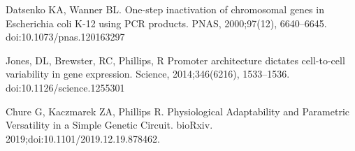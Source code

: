 \documentclass[10pt,letterpaper]{article}
\begin{document}
\begin{thebibliography}{10}
	Datsenko KA, Wanner BL.
	\newblock One-step inactivation of chromosomal genes
	in Escherichia coli K-12 using PCR products.
	\newblock PNAS, 2000;97(12), 6640–6645.
	\newblock doi:{10.1073/pnas.120163297}

	Jones, DL, Brewster, RC, Phillips, R
	\newblock Promoter architecture dictates cell-to-cell variability in gene expression.
	\newblock Science, 2014;346(6216), 1533--1536.
	\newblock doi:{10.1126/science.1255301}

	Chure G, Kaczmarek ZA, Phillips R.
	\newblock Physiological Adaptability and Parametric Versatility in a Simple
	Genetic Circuit.
	\newblock bioRxiv. 2019;doi:{10.1101/2019.12.19.878462}.

\end{thebibliography}
\end{document}
